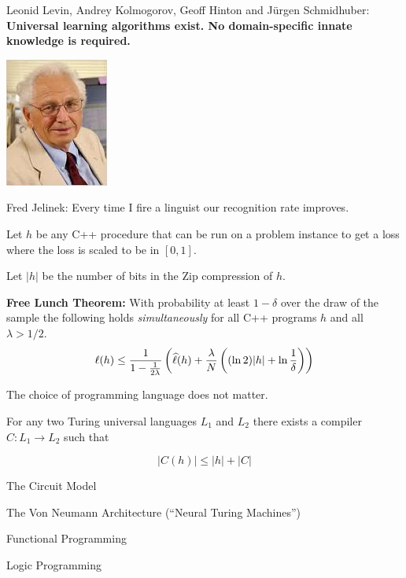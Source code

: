 {\begin{minipage}[b]{7in}
  Leonid Levin, Andrey Kolmogorov, Geoff Hinton and J\"{u}rgen Schmidhuber: {\bf Universal learning algorithms exist.
  No domain-specific innate knowledge is required.}
\end{minipage}



\vfill
\includegraphics[width=1.0 in]{../images/Jelinek} \begin{minipage}[b]{8in}
Fred Jelinek: Every time I fire a linguist our recognition rate improves.
\end{minipage}
\vfill
\vfill


Let $h$ be any C++ procedure that can be run on a problem instance to get a loss where the loss is scaled to be in $[0,1]$.

\vfill
Let $|h|$ be the number of bits in the Zip compression of $h$.

\vfill
{\bf Free Lunch Theorem:} With probability at least $1-\delta$ over the draw of the sample the following holds {\em simultaneously} for all C++ programs $h$
and all $\lambda > 1/2$.
$$\ell(h) \leq \frac{1}{1-\frac{1}{2\lambda}}\left(\widehat{\ell}(h) + \frac{\lambda}{N}\left((\ln 2)|h| + \ln\frac{1}{\delta}\right)\right)$$



The choice of programming language does not matter.

\vfill
For any two Turing universal languages $L_1$ and $L_2$ there exists a compiler $C: L_1 \rightarrow L_2$ such that

$$|C(h)| \leq |h| + |C|$$


The Circuit Model

\vfill
The Von Neumann Architecture (``Neural Turing Machines'')

\vfill
Functional Programming

\vfill
Logic Programming


}
